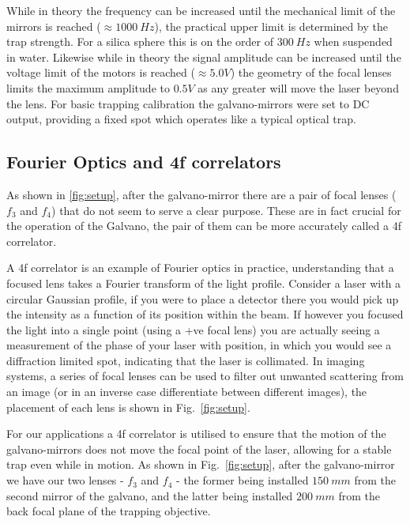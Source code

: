 While in theory the frequency can be increased until the mechanical 
limit of the mirrors is reached ($\approx 1000\ Hz$), the practical 
upper limit is determined by the trap strength. For a silica sphere 
this is on the order of $300\ Hz$ when suspended in water. Likewise 
while in theory the signal amplitude can be increased until the 
voltage limit of the motors is reached ($\approx 5.0 V$) the geometry 
of the focal lenses limits the maximum amplitude to $0.5 V$ as any 
greater will move the laser beyond the lens. For basic trapping 
calibration the galvano-mirrors were set to DC output, providing a 
fixed spot which operates like a typical optical trap. 


\subsection{Fourier Optics and 4f correlators}
\label{sec:4f_correlation}
As shown in \ref{fig:setup}, after the galvano-mirror there are a pair
of focal lenses ($f_3$ and $f_4$) that do not seem to serve a clear
purpose. These are in fact crucial for the operation of the Galvano, the
pair of them can be more accurately called a 4f correlator. 

A 4f correlator is an example of Fourier optics in practice, 
understanding that a focused lens takes a Fourier transform 
of the light profile. Consider a laser with a circular Gaussian 
profile, if you were to place a detector there you would pick 
up the intensity as a function of its position within the beam. 
If however you focused the light into a single point (using a 
+ve focal lens) you are actually seeing a measurement of the 
phase of your laser with position, in which you would see a 
diffraction limited spot, indicating that the laser is 
collimated. In imaging systems, a series of focal lenses can be 
used to filter out unwanted scattering from an image (or in an 
inverse case differentiate between different images), the 
placement of each lens is shown in Fig.~\ref{fig:setup}.

For our applications a 4f correlator is utilised to ensure that the 
motion of the galvano-mirrors does not move the focal point of the 
laser, allowing for a stable trap even while in motion. As shown in Fig.~\ref{fig:setup}, after the galvano-mirror we have our two lenses 
- $f_3$ and $f_4$ - the former being installed $150\ mm$ from the 
second mirror of the galvano, and the latter being installed $200\ mm$ 
from the back focal plane of the trapping objective. 

